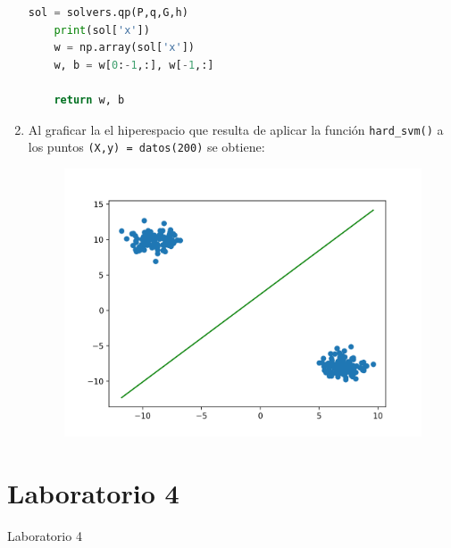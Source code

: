 \documentclass{article}
\begin{document}
\begin{enumerate}
\begin{lstlisting}[language=Python]
    sol = solvers.qp(P,q,G,h)
    print(sol['x'])
    w = np.array(sol['x'])
    w, b = w[0:-1,:], w[-1,:]

    return w, b
  \end{lstlisting}
  
  \item Al graficar la el hiperespacio que resulta de aplicar la función \verb|hard_svm()| a los puntos  \verb|(X,y) = datos(200)| se obtiene:
  \begin{figure}[H]
    \includegraphics{img/hsvm200.png}
  \end{figure}
\end{enumerate}

\section{Laboratorio 4}
Laboratorio 4
\end{document}
